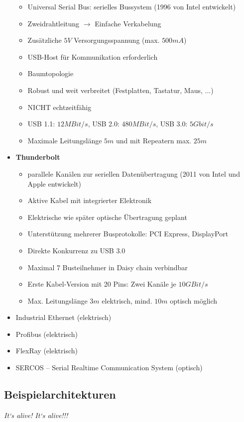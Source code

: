 \begin{itemize}
\begin{itemize}
\item Universal Serial Bus: serielles Bussystem (1996 von Intel entwickelt)
\item Zweidrahtleitung $\rightarrow$ Einfache Verkabelung
\item Zusätzliche $5V$ Versorgungsspannung (max. $500mA$)
\item USB-Host für Kommunikation erforderlich
\item Baumtopologie
\item Robust und weit verbreitet (Festplatten, Tastatur, Maus, ...)
\item NICHT echtzeitfähig
\item USB 1.1: $12MBit/s$, USB 2.0: $480MBit/s$, USB 3.0: $5Gbit/s$
\item Maximale Leitungslänge $5m$ und mit Repeatern max. $25m$
\end{itemize}
\item \textbf{Thunderbolt}
\begin{itemize}
\item parallele Kanälen zur seriellen Datenübertragung (2011 von Intel und Apple entwickelt)
\item Aktive Kabel mit integrierter Elektronik
\item Elektrische wie später optische Übertragung geplant
\item Unterstützung mehrerer Busprotokolle: PCI Express, DisplayPort
\item Direkte Konkurrenz zu USB 3.0
\item Maximal 7 Busteilnehmer in Daisy chain verbindbar
\item Erste Kabel-Version mit 20 Pins: Zwei Kanäle je $10GBit/s$
\item Max. Leitungslänge $3m$ elektrisch, mind. $10m$ optisch möglich
\end{itemize}
\item Industrial Ethernet (elektrisch)
\item Profibus (elektrisch)
\item FlexRay (elektrisch)
\item SERCOS – Serial Realtime Communication System (optisch)
\end{itemize}
\subsection{Beispielarchitekturen}
\emph{It‘s alive! It‘s alive!!!}
